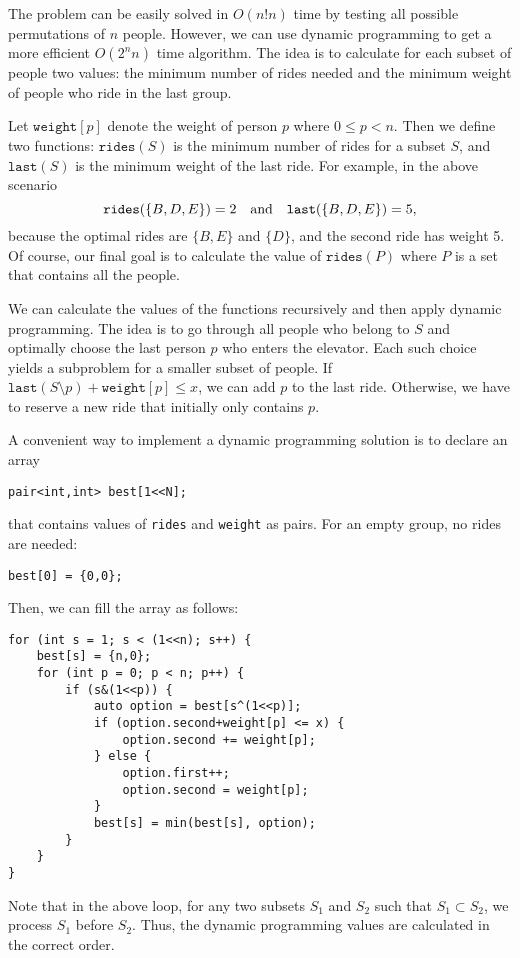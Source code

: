 The problem can be easily solved in $O(n! n)$ time
by testing all possible permutations of $n$ people.
However, we can use dynamic programming to get
a more efficient $O(2^n n)$ time algorithm.
The idea is to calculate for each subset of people
two values: the minimum number of rides needed and
the minimum weight of people who ride in the last group.

Let $\texttt{weight}[p]$ denote the weight of
person $p$ where $0 \le p < n$.
Then we define two functions:
$\texttt{rides}(S)$ is the minimum number of
rides for a subset $S$,
and $\texttt{last}(S)$ is the minimum weight
of the last ride.
For example, in the above scenario
\[ \texttt{rides}(\{B,D,E\})=2 \hspace{10px} \textrm{and}
\hspace{10px} \texttt{last}(\{B,D,E\})=5,\]
because the optimal rides are $\{B,E\}$ and $\{D\}$,
and the second ride has weight 5.
Of course, our final goal is to calculate the value
of $\texttt{rides}(P)$ where $P$ is a set that
contains all the people.

We can calculate the values
of the functions recursively and then apply
dynamic programming.
The idea is to go through all people
who belong to $S$ and optimally
choose the last person $p$ who enters the elevator.
Each such choice yields a subproblem
for a smaller subset of people.
If $\texttt{last}(S \setminus p)+\texttt{weight}[p] \le x$,
we can add $p$ to the last ride.
Otherwise, we have to reserve a new ride
that initially only contains $p$.

A convenient way to implement a dynamic programming
solution is to declare an array
\begin{lstlisting}
pair<int,int> best[1<<N];
\end{lstlisting}
that contains values of \texttt{rides} and \texttt{weight}
as pairs. For an empty group, no rides are needed:
\begin{lstlisting}
best[0] = {0,0};
\end{lstlisting}
Then, we can fill the array as follows:

\begin{lstlisting}
for (int s = 1; s < (1<<n); s++) {
    best[s] = {n,0};
    for (int p = 0; p < n; p++) {
        if (s&(1<<p)) {
            auto option = best[s^(1<<p)];
            if (option.second+weight[p] <= x) {
                option.second += weight[p];
            } else {
                option.first++;
                option.second = weight[p];
            }
            best[s] = min(best[s], option);
        }
    }
}
\end{lstlisting}
Note that in the above loop, for any two subsets $S_1$ and $S_2$
such that $S_1 \subset S_2$, we process $S_1$ before $S_2$.
Thus, the dynamic programming values are calculated in the
correct order.

